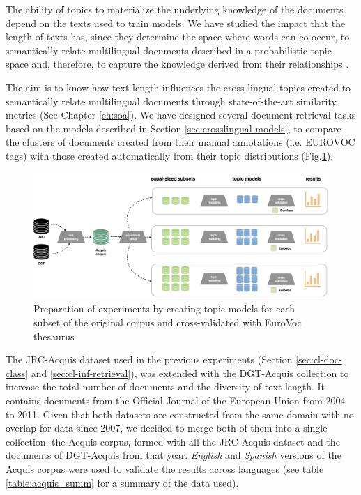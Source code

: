 The ability of topics to materialize the underlying knowledge of the documents depend on the texts used to train models. We have studied the impact that the length of texts has, since they determine the space where words can co-occur, to semantically relate multilingual documents described in a probabilistic topic space and, therefore, to capture the knowledge derived from their relationships \citep{Badenes-Olmedo2021}. 

The aim is to know how text length influences the cross-lingual topics created to semantically relate multilingual documents through state-of-the-art similarity metrics (See Chapter \ref{ch:soa}). We have designed several document retrieval tasks based on the models described in Section \ref{sec:crosslingual-models}, to compare the clusters of documents created from their manual annotations (i.e. EUROVOC tags) with those created automatically from their topic distributions (Fig.\ref{fig:workflow}). 

\begin{figure}[ht]
    \centering
    \includegraphics[width=1.0\linewidth]{workflow.png}
    \caption{Preparation of experiments by creating topic models for each \\subset of the original corpus and cross-validated with EuroVoc thesaurus}
    \label{fig:workflow}
\end{figure}


The JRC-Acquis dataset used in the previous experiments (Section \ref{sec:cl-doc-class} and \ref{sec:cl-inf-retrieval}), was extended with the DGT-Acquis \citep{Steinberger2014} collection to increase the total number of documents and the diversity of text length. It contains documents from the Official Journal of the European Union from 2004 to 2011. Given that both datasets are constructed from the same domain with no overlap for data since 2007, we decided to merge both of them into a single collection, the Acquis corpus, formed with all the JRC-Acquis dataset and the documents of DGT-Acquis from that year. \textit{English} and \textit{Spanish} versions of the Acquis corpus were used to validate the results across languages (see table \ref{table:acquis_summ} for a summary of the data used). 

